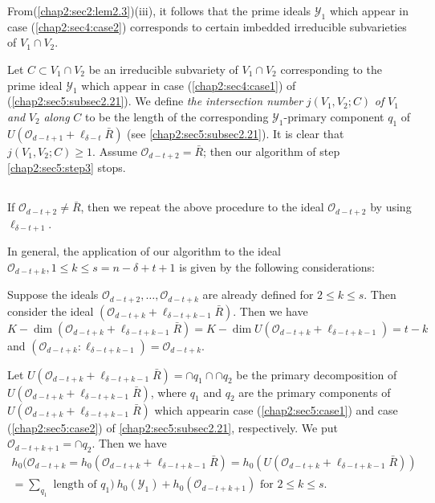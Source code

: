 From\pageoriginale (\ref{chap2:sec2:lem2.3})(iii), it follows that the
prime ideals $\mathscr{Y}_1$ 
which appear in case (\ref{chap2:sec4:case2}) corresponds to certain
imbedded irreducible subvarieties of $V_1 \cap V_2$. 

\setcounter{definition}{21}
\begin{definition}\label{chap2:sec5:def2.22}
  Let $C\subset V_1 \cap V_2$ be an irreducible subvariety of $V_1
  \cap V_2$ corresponding to the prime ideal $\mathscr{Y}_1$ which
  appear in case (\ref{chap2:sec4:case1}) of
  (\ref{chap2:sec5:subsec2.21}). We define \textit{ the intersection 
    number } $j(V_1,V_2;C)$ \textit{ of } $V_1$ \textit{ and } $V_2$
  \textit{ along } $C$ to be the length of the corresponding
  $\mathscr{Y}_1$-primary component $q_1$ of
  $U(\mathscr{O}_{d-t+1}+\ell_{\delta-t}\bar{R})$ (see
  \ref{chap2:sec5:subsec2.21}). It is
  clear that $j(V_1,V_2;C)\geq 1$. Assume $\mathscr{O}_{d-t+2} =
  \bar{R}$; then our algorithm of step \ref{chap2:sec5:step3} stops. 
\end{definition}

\setcounter{subsection}{22}
\subsection{}\label{chap2:sec5:subsec2.23}
If $\mathscr{O}_{d-t+2}\neq\bar{R}$, then we repeat the above
procedure to the ideal $\mathscr{O}_{d-t+2}$ by using $\ell_{\delta
  -t+1}$. 

In general, the application of our algorithm to the ideal
$\mathscr{O}_{d-t+k},1\leq k \leq s = n-\delta +t+1$ is given by the
following considerations: 

Suppose the ideals $\mathscr{O}_{d-t+2},\ldots,\mathscr{O}_{d-t+k}$
are already defined for $2\leq k \leq s$. Then consider the ideal
$(\mathscr{O}_{d-t+k}+\ell_{\delta -t+k-1}\bar{R})$. Then we have 
$$
K-\dim (\mathscr{O}_{d-t+k}+\ell_{\delta-t+k-1}\bar{R})= K -\dim
U(\mathscr{O}_{d-t+k}+\ell_{\delta-t+k-1})= t-k
$$
and $(\mathscr{O}_{d-t+k}:  \ell_{\delta-t+k-1}) = \mathscr{O}_{d-t+k}$.

Let $U(\mathscr{O}_{d-t+k}+\ell_{\delta-t+k-1}\bar{R}) = \cap q_1 \cap
\cap q_2$ be the primary decomposition of
$U(\mathscr{O}_{d-t+k}+\ell_{\delta-t+k-1}\bar{R})$, where $q_1$ and
$q_2$ are the primary components of
$U(\mathscr{O}_{d-t+k}+\ell_{\delta-t+k-1}\bar{R})$ which appear\pageoriginale in
case (\ref{chap2:sec5:case1}) and case (\ref{chap2:sec5:case2}) of
\ref{chap2:sec5:subsec2.21}, respectively. We put
$\mathscr{O}_{d-t+k+1} = \cap q_2$. Then we have 
\begin{multline*}
h_0(\mathscr{O}_{d-t+k} =
h_0(\mathscr{O}_{d-t+k}+\ell_{\delta-t+k-1}\bar{R})=
h_0(U(\mathscr{O}_{d-t+k}+\ell_{\delta-t+k-1}\bar{R}))\\   
= \sum_{q_1} \text{ length of } q_1)~ h_0(\mathscr{Y}_1) +
h_0(\mathscr{O}_{d-t+k+1}) \text{ for } 2 \leq k \leq s. 
\end{multline*}

